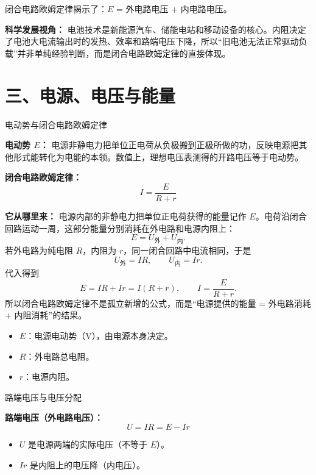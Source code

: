 闭合电路欧姆定律揭示了：$E$ = 外电路电压 + 内电路电压。

\textbf{科学发展视角：} 电池技术是新能源汽车、储能电站和移动设备的核心。内阻决定了电池大电流输出时的发热、效率和路端电压下降，所以“旧电池无法正常驱动负载”并非单纯经验判断，而是闭合电路欧姆定律的直接体现。

\section*{三、电源、电压与能量}

\begin{conceptbox}{电动势与闭合电路欧姆定律}

\textbf{电动势 $E$：} 电源非静电力把单位正电荷从负极搬到正极所做的功，反映电源把其他形式能转化为电能的本领。数值上，理想电压表测得的开路电压等于电动势。

\textbf{闭合电路欧姆定律：}
\[
\boxed{I = \frac{E}{R + r}}
\]

\textbf{它从哪里来：} 电源内部的非静电力把单位正电荷获得的能量记作 $E$。电荷沿闭合回路运动一周，这部分能量分别消耗在外电路和电源内阻上：
\[
E=U_{\text{外}}+U_{\text{内}}.
\]
若外电路为纯电阻 $R$，内阻为 $r$，同一闭合回路中电流相同，于是
\[
U_{\text{外}}=IR,\qquad U_{\text{内}}=Ir.
\]
代入得到
\[
E=IR+Ir=I(R+r),\qquad I=\frac{E}{R+r}.
\]
所以闭合电路欧姆定律不是孤立新增的公式，而是“电源提供的能量 = 外电路消耗 + 内阻消耗”的结果。

\begin{itemize}
  \item $E$：电源电动势（$\mathrm{V}$），由电源本身决定。
  \item $R$：外电路总电阻。
  \item $r$：电源内阻。
\end{itemize}

\end{conceptbox}

\begin{conceptbox}{路端电压与电压分配}

\textbf{路端电压（外电路电压）：}
\[
\boxed{U = IR = E - Ir}
\]

\begin{itemize}
  \item $U$ 是电源两端的实际电压（不等于 $E$）。
  \item $Ir$ 是内阻上的电压降（内电压）。
\end{itemize}

\end{conceptbox}

\begin{center}


\label{fig:closed-circuit}
\end{center}

